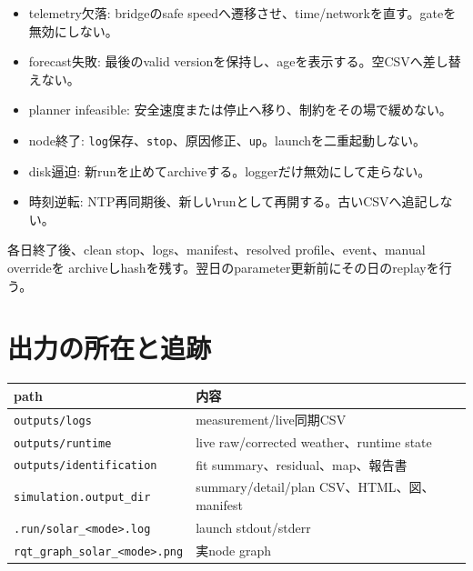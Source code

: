 \documentclass[
  japanese,
  a4paper,
]{article}
\newcounter{none} %
\providecommand{\tightlist}{%
  \setlength{\itemsep}{0pt}\setlength{\parskip}{0pt}}
\begin{document}
\begin{itemize}
\tightlist
\item
  telemetry欠落: bridgeのsafe
  speedへ遷移させ、time/networkを直す。gateを無効にしない。
\item
  forecast失敗: 最後のvalid
  versionを保持し、ageを表示する。空CSVへ差し替えない。
\item
  planner infeasible: 安全速度または停止へ移り、制約をその場で緩めない。
\item
  node終了:
  \texttt{log}保存、\texttt{stop}、原因修正、\texttt{up}。launchを二重起動しない。
\item
  disk逼迫: 新runを止めてarchiveする。loggerだけ無効にして走らない。
\item
  時刻逆転: NTP再同期後、新しいrunとして再開する。古いCSVへ追記しない。
\end{itemize}

各日終了後、clean stop、logs、manifest、resolved profile、event、manual
overrideを
archiveしhashを残す。翌日のparameter更新前にその日のreplayを行う。

\section{出力の所在と追跡}\label{ux51faux529bux306eux6240ux5728ux3068ux8ffdux8de1}

{\def\LTcaptype{none} %
\begin{longtable}[]{@{}
  >{\raggedright\arraybackslash}p{}
  >{\raggedright\arraybackslash}p{}@{}}
\toprule\noalign{}
\begin{minipage}[b]{\linewidth}\raggedright
path
\end{minipage} & \begin{minipage}[b]{\linewidth}\raggedright
内容
\end{minipage} \\
\midrule\noalign{}
\endhead
\bottomrule\noalign{}
\endlastfoot
\texttt{outputs/logs} & measurement/live同期CSV \\
\texttt{outputs/runtime} & live raw/corrected weather、runtime state \\
\texttt{outputs/identification} & fit summary、residual、map、報告書 \\
\texttt{simulation.output\_dir} & summary/detail/plan
CSV、HTML、図、manifest \\
\texttt{.run/solar\_\textless{}mode\textgreater{}.log} & launch
stdout/stderr \\
\texttt{rqt\_graph\_solar\_\textless{}mode\textgreater{}.png} & 実node
graph \\
\end{longtable}
}
\end{document}

